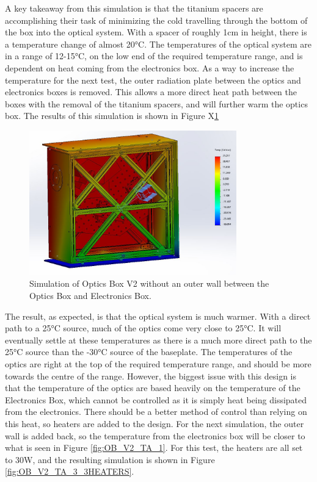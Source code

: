 A key takeaway from this simulation is that the titanium spacers are accomplishing their task of minimizing the cold travelling through the bottom of the box into the optical system. With a spacer of roughly 1cm in height, there is a temperature change of almost 20°C. The temperatures of the optical system are in a range of 12-15°C, on the low end of the required temperature range, and is dependent on heat coming from the electronics box. As a way to increase the temperature for the next test, the outer radiation plate between the optics and electronics boxes is removed. This allows a more direct heat path between the boxes with the removal of the titanium spacers, and will further warm the optics box. The results of this simulation is shown in Figure X\ref{fig:OB_V2_TA_2}

\begin{figure}
    \centering
    \includegraphics[width=0.8\textwidth]{chap3_images/LIFE_V2_images/TA_25_-30_no_front_left_outer_walls.JPG}
    \caption{Simulation of Optics Box V2 without an outer wall between the Optics Box and Electronics Box.}
    \label{fig:OB_V2_TA_2}
\end{figure}

The result, as expected, is that the optical system is much warmer. With a direct path to a 25°C source, much of the optics come very close to 25°C. It will eventually settle at these temperatures as there is a much more direct path to the 25°C source than the -30°C source of the baseplate. The temperatures of the optics are right at the top of the required temperature range, and should be more towards the centre of the range. However, the biggest issue with this design is that the temperature of the optics are based heavily on the temperature of the Electronics Box, which cannot be controlled as it is simply heat being dissipated from the electronics. There should be a better method of control than relying on this heat, so heaters are added to the design. For the next simulation, the outer wall is added back, so the temperature from the electronics box will be closer to what is seen in Figure \ref{fig:OB_V2_TA_1}. For this test, the heaters are all set to 30W, and the resulting simulation is shown in Figure \ref{fig:OB_V2_TA_3_3HEATERS}.


